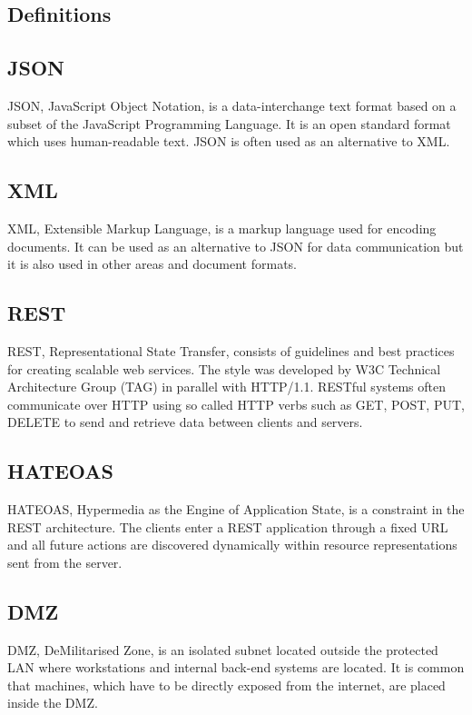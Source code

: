 \documentclass{cslthse-msc}
\begin{document}
\begin{appendices}
\chapter{Definitions}
\section{JSON}
JSON, JavaScript Object Notation, is a data-interchange text format based on a subset of the JavaScript Programming Language. It is an open standard format which uses human-readable text. JSON is often used as an alternative to XML.

\section{XML}
XML, Extensible Markup Language, is a markup language used for encoding documents. It can be used as an alternative to JSON for data communication but it is also used in other areas and document formats.

\section{REST}
REST, Representational State Transfer, consists of guidelines and best practices for creating scalable web services. The style was developed by W3C Technical Architecture Group (TAG) in parallel with HTTP/1.1. RESTful systems often communicate over HTTP using so called HTTP verbs such as GET, POST, PUT, DELETE to send and retrieve data between clients and servers.

\section{HATEOAS}
HATEOAS, Hypermedia as the Engine of Application State, is a constraint in the REST architecture. The clients enter a REST application through a fixed URL and all future actions are discovered dynamically within resource representations sent from the server.

\section{DMZ}
DMZ, DeMilitarised  Zone, is an isolated subnet located outside the protected LAN where workstations and internal back-end systems are located. It is common that machines, which have to be directly exposed from the internet, are placed inside the DMZ.


\end{appendices}
\end{document}
